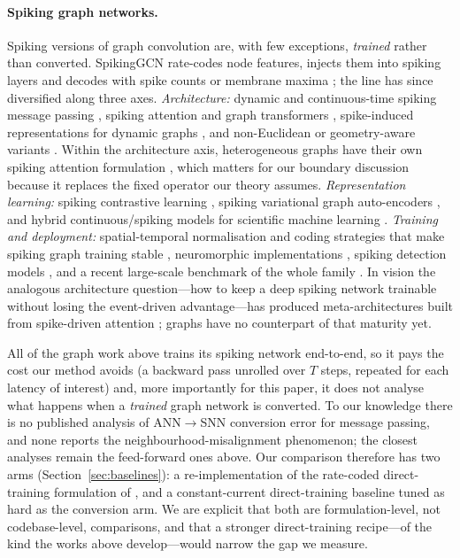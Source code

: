 \documentclass[10pt,twocolumn]{article}
\newcommand{\secref}[1]{Section~\ref{#1}}
\begin{document}
\paragraph{Spiking graph networks.}
Spiking versions of graph convolution are, with few exceptions, \emph{trained} rather than
converted. SpikingGCN rate-codes node features, injects them into spiking layers and decodes with
spike counts or membrane maxima \citep{zhu2022spiking}; the line has since diversified along three
axes. \emph{Architecture:} dynamic and continuous-time spiking message passing
\citep{yin2024dgsnn,fan2024continuous}, spiking attention and graph transformers
\citep{sun2024spikegraphormer}, spike-induced representations for dynamic graphs
\citep{chen2024signn,jahin2026chronospike}, and non-Euclidean or geometry-aware variants
\citep{sun2024riemannian,zhang2025geometry}. Within the architecture axis, heterogeneous graphs
have their own spiking attention formulation \citep{cao2025hetgat}, which matters for our boundary
discussion because it replaces the fixed operator our theory assumes. \emph{Representation learning:} spiking contrastive
learning \citep{li2023bit1}, spiking variational graph auto-encoders \citep{yang2022svgae}, and
hybrid continuous/spiking models for scientific machine learning \citep{jain2024hybrid}.
\emph{Training and deployment:} spatial-temporal normalisation and coding strategies that make
spiking graph training stable \citep{xu2024unveiling}, neuromorphic implementations
\citep{snyder2024loihi,yu2025photonic}, spiking detection models \citep{fofanah2026anomaly}, and a
recent large-scale benchmark of the whole family \citep{zhang2025sgnnbench}. In vision the analogous
architecture question---how to keep a deep spiking network trainable without losing the event-driven
advantage---has produced meta-architectures built from spike-driven attention
\citep{yao2023spiking,yao2024spikingv2}; graphs have no counterpart of that maturity yet.

All of the graph work above trains its spiking network end-to-end, so it pays the cost our method
avoids (a backward pass unrolled over $T$ steps, repeated for each latency of interest) and, more
importantly for this paper, it does not analyse what happens when a \emph{trained} graph network is
converted. To our knowledge there is no published analysis of ANN$\rightarrow$SNN conversion error
for message passing, and none reports the neighbourhood-misalignment phenomenon; the closest
analyses remain the feed-forward ones above. Our comparison therefore has two arms
(\secref{sec:baselines}): a re-implementation of the rate-coded direct-training formulation of
\citet{zhu2022spiking}, and a constant-current direct-training baseline tuned as hard as the
conversion arm. We are explicit that both are formulation-level, not codebase-level,
comparisons, and that a stronger direct-training recipe---of the kind the works above
develop---would narrow the gap we measure.
\end{document}
